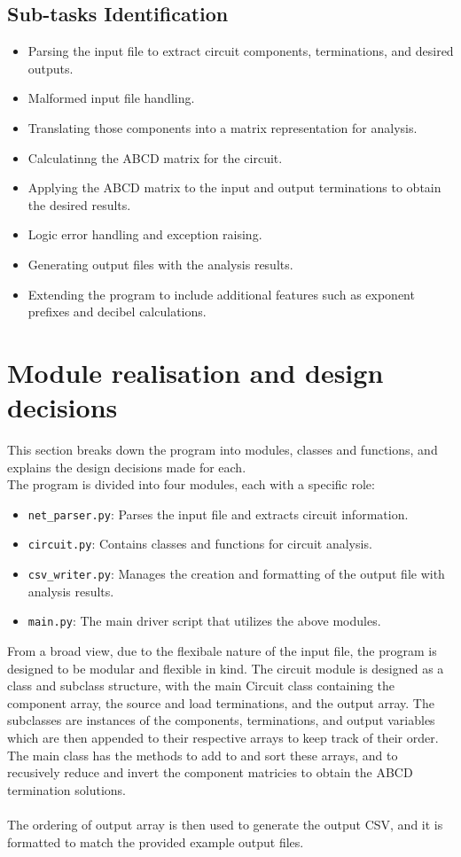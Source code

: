 \documentclass[a4paper]{article}
\begin{document}
\subsection{Sub-tasks Identification}
\begin{itemize}
    \item Parsing the input file to extract circuit components, terminations, and desired outputs.
    \item Malformed input file handling.
    \item Translating those components into a matrix representation for analysis.
    \item Calculatinng the ABCD matrix for the circuit.
    \item Applying the ABCD matrix to the input and output terminations to obtain the desired results.
    \item Logic error handling and exception raising.
    \item Generating output files with the analysis results.
    \item Extending the program to include additional features such as exponent prefixes and decibel calculations.
\end{itemize}

\section{Module realisation and design decisions}
This section breaks down the program into modules, classes and functions, and explains the design decisions made for each.\\
The program is divided into four modules, each with a specific role:
\begin{itemize}
    \item \texttt{net\_parser.py}: Parses the input file and extracts circuit information.
    \item \texttt{circuit.py}: Contains classes and functions for circuit analysis.
    \item \texttt{csv\_writer.py}: Manages the creation and formatting of the output file with analysis results.
    \item \texttt{main.py}: The main driver script that utilizes the above modules.
\end{itemize}

From a broad view, due to the flexibale nature of the input file, the program is designed to be modular and flexible in kind. The circuit module is
designed as a class and subclass structure, with the main Circuit class containing the component array, the source and load terminations, and the output array.
The subclasses are instances of the components, terminations, and output variables which are then appended to their respective arrays to keep track of their order.
The main class has the methods to add to and sort these arrays, and to recusively reduce and invert the component matricies to obtain the ABCD termination solutions.
\\\\
The ordering of output array is then used to generate the output CSV, and it is formatted to match the provided example output files. 
\end{document}
